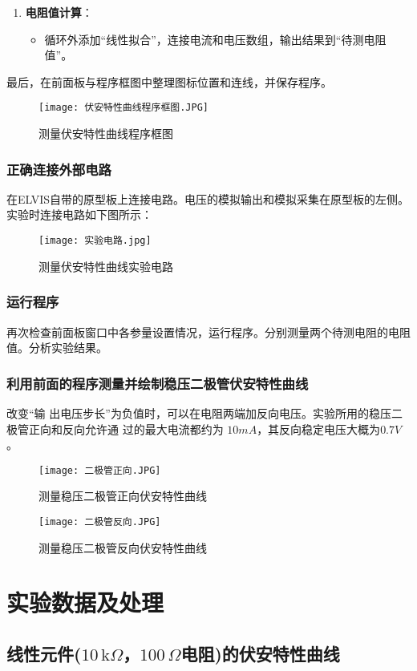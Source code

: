 \documentclass[UTF-8,twoside,cs4size]{ctexart}
\begin{document}
\begin{enumerate}
    \item \textbf{电阻值计算}：
    \begin{itemize}
        \item 循环外添加“线性拟合”，连接电流和电压数组，输出结果到“待测电阻值”。
    \end{itemize}
    
\end{enumerate}
最后，在前面板与程序框图中整理图标位置和连线，并保存程序。
\begin{figure}[!h]
    \centering
    \texttt{[image: 伏安特性曲线程序框图.JPG]}
    \caption{测量伏安特性曲线程序框图}
\end{figure}
\newpage

\subsubsection{正确连接外部电路}
在ELVIS自带的原型板上连接电路。电压的模拟输出和模拟采集在原型板的左侧。实验时连接电路如下图所示：
\begin{figure}[!h]
    \centering
    \texttt{[image: 实验电路.jpg]}
    \caption{测量伏安特性曲线实验电路}
\end{figure}
\subsubsection{运行程序}
再次检查前面板窗口中各参量设置情况，运行程序。分别测量两个待测电阻的电阻值。分析实验结果。
\subsubsection{利用前面的程序测量并绘制稳压二极管伏安特性曲线}
改变“输
出电压步长”为负值时，可以在电阻两端加反向电压。实验所用的稳压二极管正向和反向允许通
过的最大电流都约为 $10 mA$，其反向稳定电压大概为$0.7 V$。
\begin{figure}[!h]
    \centering
    \texttt{[image: 二极管正向.JPG]}
    \caption{测量稳压二极管正向伏安特性曲线}
\end{figure}
\begin{figure}[!h]
    \centering
    \texttt{[image: 二极管反向.JPG]}
    \caption{测量稳压二极管反向伏安特性曲线}
\end{figure}

\section{实验数据及处理}
    \subsection{线性元件($ 10\,\mathrm k\Omega $，$ 100\,\Omega $电阻)的伏安特性曲线}
\end{document}
